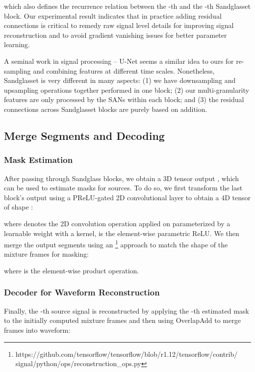 \documentclass{article}
\begin{document}
which also defines the recurrence relation between the -th and the -th Sandglasset block. Our experimental result indicates that in practice adding residual connections is critical to remedy raw signal level details for improving signal reconstruction and to avoid gradient vanishing issues for better parameter learning. 

A seminal work in signal processing -- U-Net \cite{ronneberger2015u, daniel2018unet, choi2020phase} seems a similar idea to ours for re-sampling and combining features at different time scales. Nonetheless, Sandglasset is very different in many aspects: (1) we have downsampling and upsampling operations together performed in one block; (2) our multi-granularity features are only processed by the SANs within each block; and (3) the residual connections across Sandglasset blocks are purely based on addition.
\par
\subsection{Merge Segments and Decoding}
\subsubsection{Mask Estimation}
After passing through  Sandglass blocks, we obtain a 3D tensor output , which can be used to estimate masks for  sources. To do so, we first transform the last block's output using a PReLU-gated 2D convolutional layer to obtain a 4D tensor of shape :

where  denotes the 2D convolution operation applied on  parameterized by a learnable weight  with a  kernel,  is the element-wise parametric ReLU. We then merge the output segments  using an \footnote{https://github.com/tensorflow/tensorflow/blob/r1.12/tensorflow/contrib/\\signal/python/ops/reconstruction\_ops.py} approach \cite{luo2019dual} to match the shape of the mixture frames  for masking:

where  is the element-wise product operation.

\subsubsection{Decoder for Waveform Reconstruction}
Finally, the -th source signal is reconstructed by applying the -th estimated mask to the initially computed mixture frames  and then using OverlapAdd to merge frames into waveform:
\end{document}
